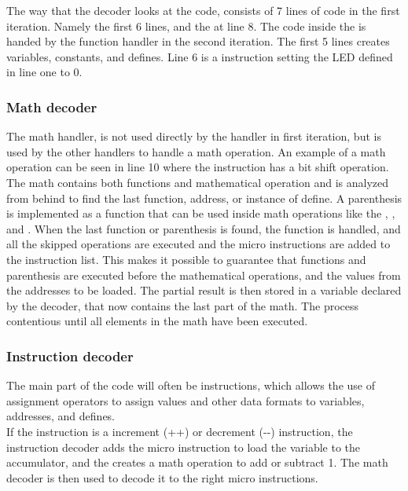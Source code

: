 The way that the decoder looks at the code,  consists of 7 lines of code in the first iteration. Namely the first 6 lines, and the  at line 8. The code inside the  is handed by the  function handler in the second iteration. The first 5 lines creates variables, constants, and defines. Line 6 is a instruction setting the LED defined in line one to 0. 

\subsubsection{Math decoder}
The math handler, is not used directly by the handler in first iteration, but is used by the other handlers to handle a math operation. An example of a math operation can be seen in  line 10 where the instruction has a bit shift operation. \\

The math contains both functions and mathematical operation and is analyzed from behind to find the last function, address, or instance of define. A parenthesis is implemented as a function that can be used inside math operations like the , , and . When the last function or parenthesis is found, the function is handled, and all the skipped operations are executed and the micro instructions are added to the instruction list. This makes it possible to guarantee that functions and parenthesis are executed before the mathematical operations, and the values from the addresses to be loaded. The partial result is then stored in a variable declared by the decoder, that now contains the last part of the math. The process contentious until all elements in the math have been executed.

\subsubsection{Instruction decoder}
The main part of the code will often be instructions, which allows the use of assignment operators to assign values and other data formats to variables, addresses, and defines.\\

If the instruction is a increment (++) or decrement ({-}-) instruction, the instruction decoder adds the micro instruction to load the variable to the accumulator, and the creates a math operation to add or subtract 1. The math decoder is then used to decode it to the right micro instructions.

